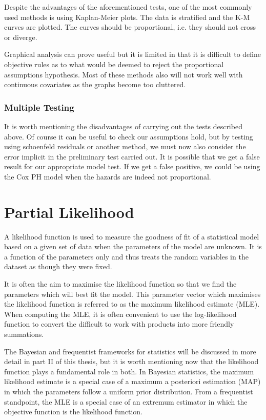 Despite the advantages of the aforementioned tests, one of the most commonly used methods is using Kaplan-Meier plots. The data is stratified and the K-M curves are plotted. The curves should be proportional, i.e. they should not cross or diverge.  

Graphical analysis can prove useful but it is limited in that it is difficult to define objective rules as to what would be deemed to reject the proportional assumptions hypothesis. Most of these methods also will not work well with continuous covariates as the graphs become too cluttered.


\subsubsection{Multiple Testing}

It is worth mentioning the disadvantages of carrying out the tests described above. Of course it can be useful to check our assumptions hold, but by testing using schoenfeld residuals or another method, we must now also consider the error implicit in the preliminary test carried out. It is possible that we get a false result for our appropriate model test. If we get a false positive, we could be using the Cox PH model when the hazards are indeed not proportional. 

\section{Partial Likelihood}\label{partial-likelihood}

A likelihood function is used to measure the goodness of fit of a statistical model based on a given set of data when the parameters of the model are unknown. It is a function of the parameters only and thus treats the random variables in the dataset as though they were fixed.

It is often the aim to maximise the likelihood function so that we find the parameters which will best fit the model. This parameter vector which maximises the likelihood function is referred to as the maximum likelihood estimate (MLE). When computing the MLE, it is often convenient to use the log-likelihood function to convert the difficult to work with products into more friendly summations.

The Bayesian and frequentist frameworks for statistics will be discussed in more detail in part II of this thesis, but it is worth mentioning now that the likelihood function plays a fundamental role in both. In Bayesian statistics, the maximum likelihood estimate is a special case of a maximum a posteriori estimation (MAP) in which the parameters follow a uniform prior distribution. From a frequentist standpoint, the MLE is a special case of an extremum estimator in which the objective function is the likelihood function.

